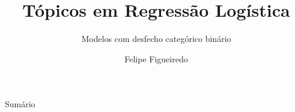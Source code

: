 \documentclass{beamer}
\title%
{Tópicos em Regressão Logística}
\subtitle
{Modelos com desfecho categórico binário} %
\author%
{Felipe Figueiredo}%
\institute[INTO] %
{Instituto Nacional de Traumatologia e Ortopedia
}
\date%
{}
\begin{document}
\begin{frame}
  \titlepage
\end{frame}

\begin{frame}{Sumário}
  \tableofcontents
\end{frame}








\end{document}
